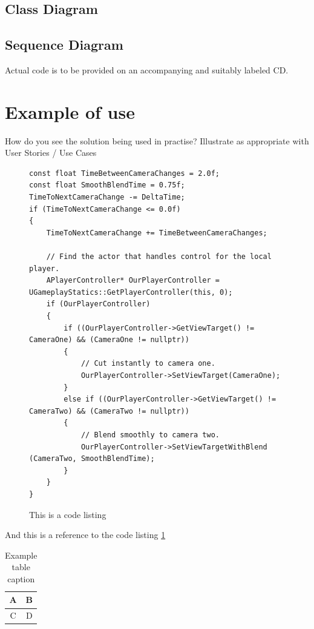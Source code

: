 \documentclass[12pt,a4paper,titlepage]{article}
\begin{document}
\subsection{Class Diagram}

\subsection{Sequence Diagram}

Actual code is to be provided on an accompanying and suitably labeled CD.

\section{Example of use}
How do you see the solution being used in practise? Illustrate as appropriate with User Stories / Use Cases 

\begin{figure}[H]
\begin{lstlisting}
const float TimeBetweenCameraChanges = 2.0f;
const float SmoothBlendTime = 0.75f;
TimeToNextCameraChange -= DeltaTime;
if (TimeToNextCameraChange <= 0.0f)
{
    TimeToNextCameraChange += TimeBetweenCameraChanges;

    // Find the actor that handles control for the local player.
    APlayerController* OurPlayerController = UGameplayStatics::GetPlayerController(this, 0);
    if (OurPlayerController)
    {
        if ((OurPlayerController->GetViewTarget() != CameraOne) && (CameraOne != nullptr))
        {
            // Cut instantly to camera one.
            OurPlayerController->SetViewTarget(CameraOne);
        }
        else if ((OurPlayerController->GetViewTarget() != CameraTwo) && (CameraTwo != nullptr))
        {
            // Blend smoothly to camera two.
            OurPlayerController->SetViewTargetWithBlend (CameraTwo, SmoothBlendTime);
        }
    }
}
\end{lstlisting}
	\caption{This is a code listing}
	\label{code:raig header file}
\end{figure}

And this is a reference to the code listing \ref{code:raig header file}


\begin{table}[H] %
\begin{center}

\begin{tabular}{ | c | c |}
\hline
A & B \\ 
\hline
C & D \\
\hline
\end{tabular}
\caption{Example table caption}
\label{table:x Example table}
\end{center}
\end{table}
\end{document}
